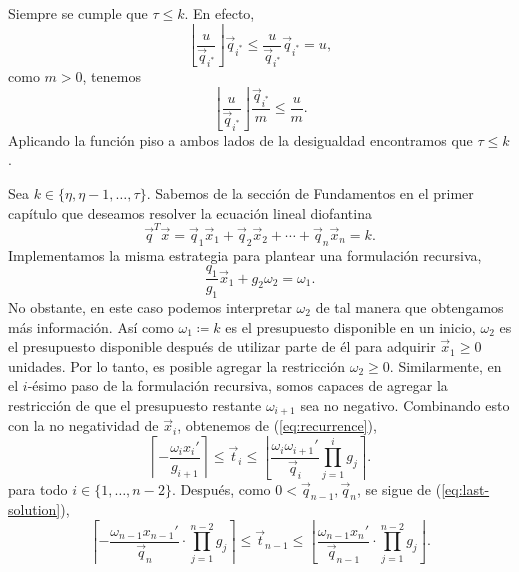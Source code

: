 \begin{observation}
	Siempre se cumple que $\tau \leq k$. En efecto,
	\begin{equation*}
		\left\lfloor \frac{u}{\vec{q}_{i^*}} \right\rfloor \vec{q}_{i^*}
		\leq \frac{u}{\vec{q}_{i^*}} \vec{q}_{i^*} = u,
	\end{equation*}
	como $m > 0$, tenemos
	\begin{equation*}
		\left\lfloor \frac{u}{\vec{q}_{i^*}} \right\rfloor \frac{\vec{q}_{i^*}}{m}
		\leq \frac{u}{m}.
	\end{equation*}
	Aplicando la función piso a ambos lados de la desigualdad encontramos que $\tau \leq k$.
\end{observation}
Sea $k \in \lbrace \eta, \eta - 1, \ldots, \tau \rbrace$. Sabemos de la sección de Fundamentos en el
primer capítulo que deseamos resolver la ecuación lineal diofantina
\begin{equation*}
	\vec{q}^T\vec{x} = \vec{q}_1\vec{x}_1 + \vec{q}_2\vec{x}_2 + \cdots + \vec{q}_n\vec{x}_n = k.
\end{equation*}
Implementamos la misma estrategia para plantear una formulación recursiva,
\begin{equation*}
	\frac{q_1}{g_1}\vec{x}_1 + g_2\omega_2 = \omega_1.
\end{equation*}
No obstante, en este caso podemos interpretar $\omega_2$ de tal manera que obtengamos más
información. Así como $\omega_1 \coloneq k$  es el presupuesto disponible en un inicio, $\omega_2$
es el presupuesto disponible después de utilizar parte de él para adquirir $\vec{x}_1 \geq 0$ unidades.
Por lo tanto, es posible agregar la restricción $\omega_2 \geq 0$. Similarmente, en el $i$-ésimo
paso de la formulación recursiva, somos capaces de agregar la restricción de que el presupuesto
restante $\omega_{i + 1}$ sea no negativo. Combinando esto con la no negatividad de $\vec{x}_i$, obtenemos
de (\ref{eq:recurrence}),
\begin{equation}
	\label{phase-1:finite:eq:param-bounds}
	\left\lceil -\frac{\omega_ix_i'}{g_{i+1}} \right\rceil
	\leq
	\vec{t}_i
	\leq
	\left\lfloor \frac{\omega_i\omega_{i+1}'}{\vec{q}_i} \prod_{j=1}^{i}g_j \right\rceil.
\end{equation}
para todo $i \in \lbrace 1, \ldots, n - 2\rbrace$. Después, como $0 < \vec{q}_{n - 1}, \vec{q}_n$, se sigue de
(\ref{eq:last-solution}),
\begin{equation}
	\label{phase-1:finite:eq:param-bounds-last}
	\left\lceil -\frac{\omega_{n-1}x_{n-1}'}{\vec{q}_n} \cdot \prod_{j=1}^{n-2}g_j \right\rceil
	\leq
	\vec{t}_{n - 1}
	\leq
	\left\lfloor \frac{\omega_{n-1}x_{n}'}{\vec{q}_{n-1}} \cdot \prod_{j=1}^{n-2}g_j \right\rfloor.
\end{equation}

